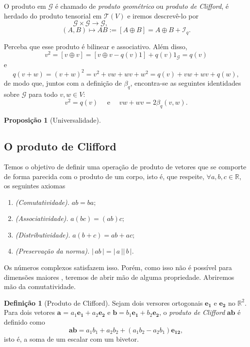 \documentclass[a4paper,12pt]{report}
\theoremstyle{plain}
\newtheorem{proposicao}{Proposição}[section]
\theoremstyle{definition}
\newtheorem{definicao}{Definição}[section]
\begin{document}
O produto em $\mathcal{G}$ é chamado de \textit{produto geométrico} ou \textit{produto de Clifford}, é herdado do produto tensorial em $\mathcal{T}(V)$ e iremos descrevê-lo por $$\mathcal{G}\times \mathcal{G}\rightarrow\mathcal{G},\quad \quad \quad\quad \quad \quad\quad \quad\quad \quad\ \ $$$$(A,B)\mapsto AB:= [A\oplus B] = A\oplus
 B+\mathcal{I}_q.$$
 
Perceba que esse produto é bilinear e associativo. Além disso, $$v^2 = [v\oplus v] = [v\oplus v-q(v)1] + q(v)1_\mathcal{G} = q(v)$$ e $$q(v+w) = (v+w)^2 = v^2 + vw + wv + w^2 = q(v) + vw + wv + q(w),$$
de modo que, juntos com a definição de $\beta_q$, encontra-se as seguintes identidades sobre $\mathcal{G}$ para todo $v,w \in V$: $$v^2 = q(v)\quad \text{ e } \quad vw+wv = 2\beta_q(v,w).$$

\begin{proposicao}[Universalidade]
	
\end{proposicao} 
 
\subsection{O produto de Clifford}

Temos o objetivo de definir uma operação de produto de vetores que se comporte de forma parecida com o produto de um corpo, isto é, que respeite, $\forall a,b,c \in \mathbb{R}$, os seguintes axiomas
\begin{enumerate}
	\item \emph{(Comutatividade).} $ab = ba;$
	\item \emph{(Associatividade).} $a(bc)=(ab)c;$
	\item \emph{(Distributividade).} $a(b+c)=ab+ac;$
	\item \emph{(Preservação da norma).} $|\,ab\,| = |\,a\,||\,b\,|.$
\end{enumerate}

Os números complexos satisfazem isso. Porém, como isso não é possível para dimensões maiores \cite{lounestoClifford}, teremos de abrir mão de alguma propriedade. Abriremos mão da comutatividade.

\begin{definicao}[Produto de Clifford]
	Sejam dois versores ortogonais $\mathbf{e_1}$ e $\mathbf{e_2}$ no $\mathbb{R}^2$. Para dois vetores $\mathbf{a}$ = $a_1\mathbf{e_1} + a_2\mathbf{e_2}$ e $\mathbf b = b_1\mathbf{e_1} + b_2\mathbf{e_2}$, o \emph{produto de Clifford} $\mathbf{ab}$ é definido como $$\mathbf{ab} = a_1b_1 + a_2b_2 + (a_1b_2-a_2b_1)\mathbf{e_{12}},$$
	isto é, a soma de um escalar com um bivetor.
\end{definicao}
\end{document}
